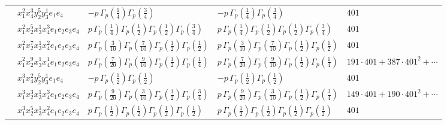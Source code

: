 \documentclass[11pt]{article}
\begin{document}
\begin{table}[ht]
{\begin{tabular}{@{}lllll@{}}
 & $x_{1}^{2} x_{4}^{3} y_{2}^{5} y_{3}^{1} e_{1} e_{4}$ & $- p \, \Gamma_p \left( \frac{1}{4} \right) \Gamma_p \left( \frac{3}{4} \right)$ & $- p \, \Gamma_p \left( \frac{1}{4} \right) \Gamma_p \left( \frac{3}{4} \right)$ & $401$ \\
 & $x_{1}^{2} x_{2}^{5} x_{3}^{1} x_{4}^{3}  e_{1} e_{2} e_{3} e_{4}$ & $p \, \Gamma_p \left( \frac{1}{4} \right) \Gamma_p \left( \frac{1}{2} \right) \Gamma_p \left( \frac{1}{2} \right) \Gamma_p \left( \frac{3}{4} \right)$ & $p \, \Gamma_p \left( \frac{1}{4} \right) \Gamma_p \left( \frac{1}{2} \right) \Gamma_p \left( \frac{1}{2} \right) \Gamma_p \left( \frac{3}{4} \right)$ & $401$ \\
 & $x_{1}^{2} x_{2}^{7} x_{3}^{1} x_{4}^{2}  e_{1} e_{2} e_{3} e_{4}$ & $p \, \Gamma_p \left( \frac{3}{10} \right) \Gamma_p \left( \frac{7}{10} \right) \Gamma_p \left( \frac{1}{2} \right) \Gamma_p \left( \frac{1}{2} \right)$ & $p \, \Gamma_p \left( \frac{3}{10} \right) \Gamma_p \left( \frac{7}{10} \right) \Gamma_p \left( \frac{1}{2} \right) \Gamma_p \left( \frac{1}{2} \right)$ & $401$ \\
 & $x_{1}^{2} x_{2}^{9} x_{3}^{1} x_{4}^{1}  e_{1} e_{2} e_{3} e_{4}$ & $p \, \Gamma_p \left( \frac{7}{20} \right) \Gamma_p \left( \frac{9}{10} \right) \Gamma_p \left( \frac{1}{2} \right) \Gamma_p \left( \frac{1}{4} \right)$ & $p \, \Gamma_p \left( \frac{7}{20} \right) \Gamma_p \left( \frac{9}{10} \right) \Gamma_p \left( \frac{1}{2} \right) \Gamma_p \left( \frac{1}{4} \right)$ & $191{\cdot}401{+}387{\cdot}401^{2}{+}\cdots$ \\
 & $x_{1}^{3} x_{4}^{2} y_{2}^{5} y_{3}^{1} e_{1} e_{4}$ & $- p \, \Gamma_p \left( \frac{1}{2} \right) \Gamma_p \left( \frac{1}{2} \right)$ & $- p \, \Gamma_p \left( \frac{1}{2} \right) \Gamma_p \left( \frac{1}{2} \right)$ & $401$ \\
 & $x_{1}^{3} x_{2}^{3} x_{3}^{1} x_{4}^{3}  e_{1} e_{2} e_{3} e_{4}$ & $p \, \Gamma_p \left( \frac{9}{20} \right) \Gamma_p \left( \frac{3}{10} \right) \Gamma_p \left( \frac{1}{2} \right) \Gamma_p \left( \frac{3}{4} \right)$ & $p \, \Gamma_p \left( \frac{9}{20} \right) \Gamma_p \left( \frac{3}{10} \right) \Gamma_p \left( \frac{1}{2} \right) \Gamma_p \left( \frac{3}{4} \right)$ & $149{\cdot}401{+}190{\cdot}401^{2}{+}\cdots$ \\
 & $x_{1}^{3} x_{2}^{5} x_{3}^{1} x_{4}^{2}  e_{1} e_{2} e_{3} e_{4}$ & $p \, \Gamma_p \left( \frac{1}{2} \right) \Gamma_p \left( \frac{1}{2} \right) \Gamma_p \left( \frac{1}{2} \right) \Gamma_p \left( \frac{1}{2} \right)$ & $p \, \Gamma_p \left( \frac{1}{2} \right) \Gamma_p \left( \frac{1}{2} \right) \Gamma_p \left( \frac{1}{2} \right) \Gamma_p \left( \frac{1}{2} \right)$ & $401$ \\

\end{tabular}}
\end{table}
\end{document}
